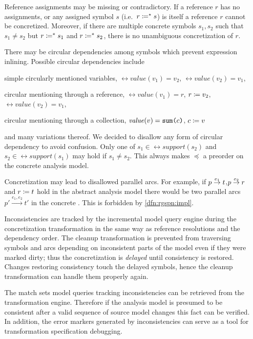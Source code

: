 \begin{itemize*}
\item Reference assignments may be missing or contradictory. If a reference \(r\) has no assignments, or any assigned symbol \(s\) (i.e.~\(r \coloneq^* s\)) is itself a reference \(r\) cannot be concretized. Moreover, if there are multiple concrete symbols \(s_1, s_2\) such that \(s_1 \ne s_2\)  but \(r \coloneq^* s_1\) and \(r \coloneq^* s_2\), there is no unambiguous concretization of \(r\).
\item There may be circular dependencies among symbols which prevent expression inlining. Possible circular dependencies include
  \begin{compactitem}
  \item simple circularly mentioned variables, \(\rel{value}(v_1) = v_2\), \(\rel{value}(v_2) = v_1\),
  \item circular mentioning through a reference, \(\rel{value}(v_1) = r\), \(r \coloneq v_2\), \(\rel{value}(v_2) = v_1\),
  \item circular mentioning through a collection, \(\textrm{\itshape value\/}(v) = \texttt{\upshape sum(}c\texttt{\upshape )}\), \(c \coloneq v\) 
  \end{compactitem}
  and many variations thereof. We decided to disallow any form of circular dependency to avoid confusion. Only one of \(s_1 \in \rel{support}(s_2)\) and \(s_2 \in \rel{support}(s_1)\) may hold if \(s_1 \ne s_2\). This always makes \(\preceq\) a preorder on the concrete analysis model.
\item Concretization may lead to disallowed parallel arcs. For example, if \(p \overset{e_1}{\rightarrow} t\),\(p \overset{e_2}{\rightarrow} r\) and \(r \coloneq t\) hold in the abstract analysis model there would be two parallel arcs \(p' \xrightarrow{e_1, e_2} t'\) in the concrete . This is forbidden by \vref{dfn:rgspn:impl}.
\end{itemize*}

Inconsistencies are tracked by the incremental model query engine during the concretization transformation in the same way as reference resolutions and the dependency order. The cleanup transformation is prevented from traversing symbols and arcs depending on inconsistent parts of the model even if they were marked dirty; thus the concretization is \emph{delayed} until consistency is restored. Changes restoring consistency touch the delayed symbols, hence the cleanup transformation can handle them properly again.

The match sets model queries tracking inconsistencies can be retrieved from the transformation engine. Therefore if the analysis model is presumed to be consistent after a valid sequence of source model changes this fact can be verified. In addition, the error markers generated by inconsistencies can serve as a tool for transformation specification debugging.
